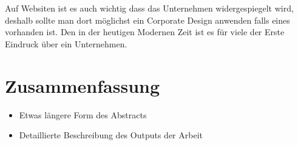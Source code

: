 Auf Websiten ist es auch wichtig dass das Unternehmen widergespiegelt wird, deshalb sollte man dort möglichst ein Corporate Design anwenden falls eines vorhanden ist. Den in der heutigen Modernen Zeit ist es für viele der Erste Eindruck über ein Unternehmen.

\chapter{Zusammenfassung}
\begin{itemize}
	\item Etwas längere Form des Abstracts
	\item Detaillierte Beschreibung des Outputs der Arbeit
\end{itemize}